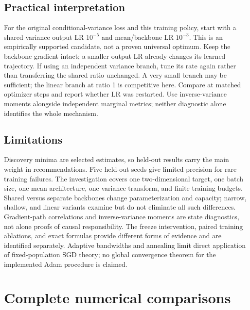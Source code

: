 \documentclass[11pt,a4paper]{article}
\begin{document}
\subsection{Practical interpretation}
For the original conditional-variance loss and this training policy, start with a shared variance output LR $10^{-5}$ and mean/backbone LR $10^{-3}$. This is an empirically supported candidate, not a proven universal optimum. Keep the backbone gradient intact; a smaller output LR already changes its learned trajectory. If using an independent variance branch, tune its rate again rather than transferring the shared ratio unchanged. A very small branch may be sufficient; the linear branch at ratio 1 is competitive here. Compare at matched optimizer steps and report whether LR was restarted. Use inverse-variance moments alongside independent marginal metrics; neither diagnostic alone identifies the whole mechanism.



\subsection{Limitations}
Discovery minima are selected estimates, so held-out results carry the main
weight in recommendations. Five held-out seeds give limited precision for
rare training failures. The investigation covers one two-dimensional target,
one batch size, one mean architecture, one variance transform, and finite
training budgets. Shared versus separate backbones change parameterization
and capacity; narrow, shallow, and linear variants examine but do not eliminate
all such differences. Gradient-path correlations and inverse-variance moments
are state diagnostics, not alone proofs of causal responsibility. The freeze
intervention, paired training ablations, and exact formulas provide different
forms of evidence and are identified separately. Adaptive bandwidths and
annealing limit direct application of fixed-population SGD theory; no global
convergence theorem for the implemented Adam procedure is claimed.

\appendix
\section{Complete numerical comparisons}
\end{document}
